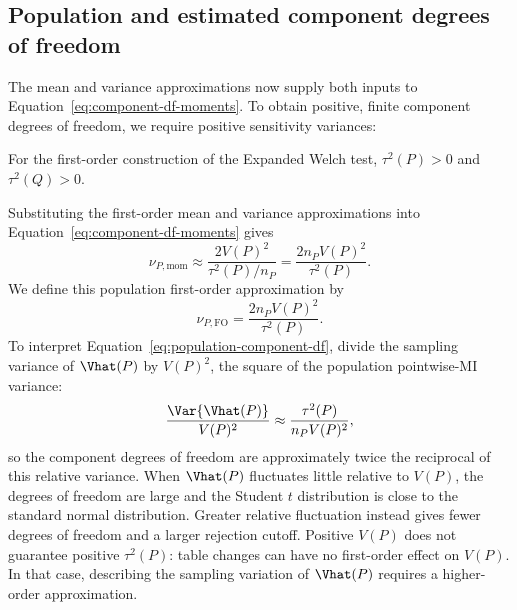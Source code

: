 \subsection{Population and estimated component degrees of freedom}

The mean and variance approximations now supply both inputs to
Equation~\eqref{eq:component-df-moments}. To obtain positive, finite
component degrees of freedom, we require positive sensitivity variances:
\begin{assumption}
For the first-order construction of the Expanded Welch test,
\(\tau^2(P)>0\) and \(\tau^2(Q)>0\).
\end{assumption}
Substituting the first-order mean and variance approximations into
Equation~\eqref{eq:component-df-moments} gives
\begin{equation*}
  \nu_{P,\mathrm{mom}}
  \approx\frac{2V(P)^2}{\tau^2(P)/n_P}
  =\frac{2n_PV(P)^2}{\tau^2(P)}.
\end{equation*}
We define this population first-order approximation by
\begin{equation}
  \boxed{
  \nu_{P,\mathrm{FO}}
  =
  \frac{2n_PV(P)^2}{\tau^2(P)}
  }.
  \label{eq:population-component-df}
\end{equation}
To interpret Equation~\eqref{eq:population-component-df}, divide the
sampling variance of \(\Vhat(P)\) by \(V(P)^2\), the square of the
population pointwise-MI variance:
\begin{equation}
  \frac{\Var\{\Vhat(P)\}}{V(P)^2}
  \approx \frac{\tau^2(P)}{n_PV(P)^2},
\end{equation}
so the component degrees of freedom are approximately twice the reciprocal
of this relative variance. When \(\Vhat(P)\) fluctuates little relative to
\(V(P)\), the degrees of freedom are large and the Student \(t\)
distribution is close to the standard normal distribution. Greater relative
fluctuation instead gives fewer degrees of freedom and a larger rejection
cutoff.
Positive \(V(P)\) does not guarantee positive \(\tau^2(P)\): table changes
can have no first-order effect on \(V(P)\). In that case, describing the
sampling variation of \(\Vhat(P)\) requires a higher-order approximation.

\medskip
{}

